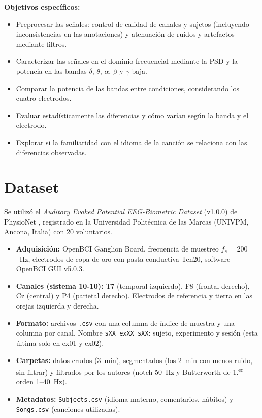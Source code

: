 \documentclass[11pt,a4paper]{article}
\begin{document}
\textbf{Objetivos específicos:}
\begin{itemize}
  \item Preprocesar las señales: control de calidad de canales y sujetos (incluyendo inconsistencias en las anotaciones) y atenuación de ruidos y artefactos mediante filtros.
  \item Caracterizar las señales en el dominio frecuencial mediante la PSD y la potencia en las bandas $\delta$, $\theta$, $\alpha$, $\beta$ y $\gamma$ baja.
  \item Comparar la potencia de las bandas entre condiciones, considerando los cuatro electrodos.
  \item Evaluar estadísticamente las diferencias y cómo varían según la banda y el electrodo.
  \item Explorar si la familiaridad con el idioma de la canción se relaciona con las diferencias observadas.
\end{itemize}

\section{Dataset}
Se utilizó el \textit{Auditory Evoked Potential EEG-Biometric Dataset} (v1.0.0) de PhysioNet \cite{aboalzahab}, registrado en la Universidad Politécnica de las Marcas (UNIVPM, Ancona, Italia) con 20 voluntarios.

\begin{itemize}
  \item \textbf{Adquisición:} OpenBCI Ganglion Board, frecuencia de muestreo $f_s = 200$~Hz, electrodos de copa de oro con pasta conductiva Ten20, software OpenBCI GUI v5.0.3.
  \item \textbf{Canales (sistema 10-10):} T7 (temporal izquierdo), F8 (frontal derecho), Cz (central) y P4 (parietal derecho). Electrodos de referencia y tierra en las orejas izquierda y derecha.
  \item \textbf{Formato:} archivos \texttt{.csv} con una columna de índice de muestra y una columna por canal. Nombre \texttt{sXX\_exXX\_sXX}: sujeto, experimento y sesión (esta última solo en ex01 y ex02).
  \item \textbf{Carpetas:} datos crudos (3~min), segmentados (los 2~min con menos ruido, sin filtrar) y filtrados por los autores (notch 50~Hz y Butterworth de 1.\textsuperscript{er} orden 1--40~Hz).
  \item \textbf{Metadatos:} \texttt{Subjects.csv} (idioma materno, comentarios, hábitos) y \texttt{Songs.csv} (canciones utilizadas).
\end{itemize}
\end{document}
